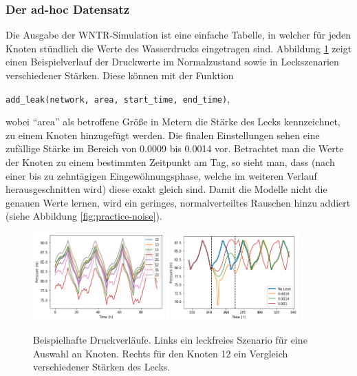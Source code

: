 \subsubsection*{Der ad-hoc Datensatz}

Die Ausgabe der WNTR-Simulation ist eine einfache Tabelle, in welcher für jeden Knoten stündlich die Werte des
 Wasserdrucks eingetragen sind. Abbildung \ref{fig:practice-sim} zeigt einen Beispielverlauf der Druckwerte im Normalzustand sowie
 in Leckszenarien verschiedener Stärken. Diese können mit der Funktion
 \begin{center}
    \texttt{add\_leak(network, area, start\_time, end\_time)},
 \end{center}
 wobei “area” als betroffene Größe in Metern die Stärke
 des Lecks kennzeichnet, zu einem Knoten hinzugefügt werden. Die finalen Einstellungen sehen eine zufällige Stärke
 im Bereich von 0.0009 bis 0.0014 vor. Betrachtet man die Werte der Knoten zu einem bestimmten Zeitpunkt am Tag,
 so sieht man, dass (nach einer bis zu zehntägigen Eingewöhnungsphase, welche im weiteren Verlauf herausgeschnitten
 wird) diese exakt gleich sind. Damit die Modelle nicht die genauen Werte lernen, wird ein geringes,
 normalverteiltes Rauschen hinzu addiert (siehe Abbildung \ref{fig:practice-noise}).

\begin{figure}[ht]
    \centering
    \includegraphics[width=0.45\textwidth]{res/practice-sim-noleak.png}
    \includegraphics[width=0.45\textwidth]{res/practice-sim-leak.png}
    \caption{Beispielhafte Druckverläufe. Links ein leckfreies Szenario für eine Auswahl an Knoten. Rechts
        für den Knoten 12 ein Vergleich verschiedener Stärken des Lecks.}
    \label{fig:practice-sim}
\end{figure}


